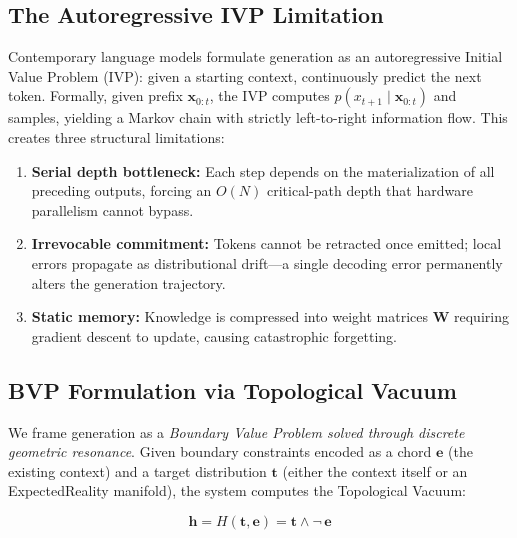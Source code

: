 \subsection{The Autoregressive IVP Limitation}
\label{sec:ivp_limitation}

Contemporary language models formulate generation as an autoregressive
Initial Value Problem (IVP): given a starting context, continuously predict
the next token.  Formally, given prefix $\mathbf{x}_{0:t}$, the IVP
computes $p(x_{t+1} \mid \mathbf{x}_{0:t})$ and samples, yielding a
Markov chain with strictly left-to-right information flow.  This creates
three structural limitations:

\begin{enumerate}[nosep]
  \item \textbf{Serial depth bottleneck:}  Each step depends on the
        materialization of all preceding outputs, forcing an $O(N)$
        critical-path depth that hardware parallelism cannot bypass.
  \item \textbf{Irrevocable commitment:}  Tokens cannot be retracted once
        emitted; local errors propagate as distributional drift---a single
        decoding error permanently alters the generation trajectory.
  \item \textbf{Static memory:}  Knowledge is compressed into weight
        matrices $\mathbf{W}$ requiring gradient descent to update,
        causing catastrophic forgetting.
\end{enumerate}

\subsection{BVP Formulation via Topological Vacuum}
\label{sec:topological_vacuum}

We frame generation as a \emph{Boundary Value Problem solved through
discrete geometric resonance}.  Given boundary constraints encoded as
a chord $\mathbf{e}$ (the existing context) and a target distribution
$\mathbf{t}$ (either the context itself or an ExpectedReality manifold),
the system computes the Topological Vacuum:

\begin{equation}
  \mathbf{h} = H(\mathbf{t}, \mathbf{e}) = \mathbf{t} \land \lnot\,\mathbf{e}
  \label{eq:chord_hole_bvp}
\end{equation}

